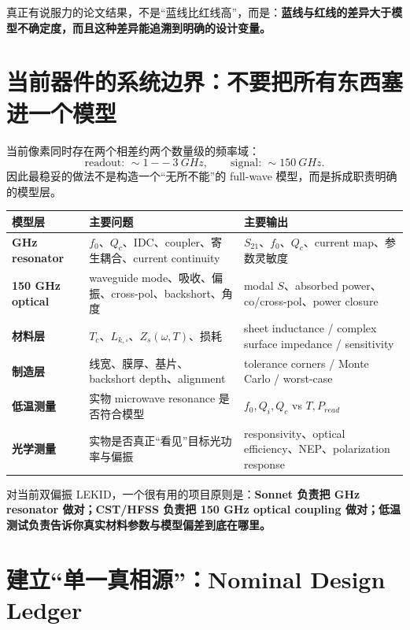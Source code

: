 \documentclass[11pt,a4paper,openany]{ctexrep}
\begin{document}
\begin{intuitionbox}
真正有说服力的论文结果，不是“蓝线比红线高”，而是：\textbf{蓝线与红线的差异大于模型不确定度，而且这种差异能追溯到明确的设计变量。}
\end{intuitionbox}

\section{当前器件的系统边界：不要把所有东西塞进一个模型}

当前像素同时存在两个相差约两个数量级的频率域：
\[
\text{readout: }\sim\SI{1}{--}\SI{3}{GHz},
\qquad
\text{signal: }\sim\SI{150}{GHz}.
\]
因此最稳妥的做法不是构造一个“无所不能”的 full-wave 模型，而是拆成职责明确的模型层。

\begin{center}
\begin{tabularx}{\textwidth}{>{\bfseries}p{2.4cm} X X}
\toprule
模型层 & 主要问题 & 主要输出 \\
\midrule
GHz resonator & $f_0$、$Q_c$、IDC、coupler、寄生耦合、current continuity & $S_{21}$、$f_0$、$Q_c$、current map、参数灵敏度 \\
150 GHz optical & waveguide mode、吸收、偏振、cross-pol、backshort、角度 & modal $S$、absorbed power、co/cross-pol、power closure \\
材料层 & $T_c$、$L_{k,\square}$、$Z_s(\omega,T)$、损耗 & sheet inductance / complex surface impedance / sensitivity \\
制造层 & 线宽、膜厚、基片、backshort depth、alignment & tolerance corners / Monte Carlo / worst-case \\
低温测量 & 实物 microwave resonance 是否符合模型 & $f_0,Q_i,Q_c$ vs $T,P_{read}$ \\
光学测量 & 实物是否真正“看见”目标光功率与偏振 & responsivity、optical efficiency、NEP、polarization response \\
\bottomrule
\end{tabularx}
\end{center}

\begin{projectbox}
对当前双偏振 LEKID，一个很有用的项目原则是：\textbf{Sonnet 负责把 GHz resonator 做对；CST/HFSS 负责把 150 GHz optical coupling 做对；低温测试负责告诉你真实材料参数与模型偏差到底在哪里。}
\end{projectbox}

\section{建立“单一真相源”：Nominal Design Ledger}
\end{document}
